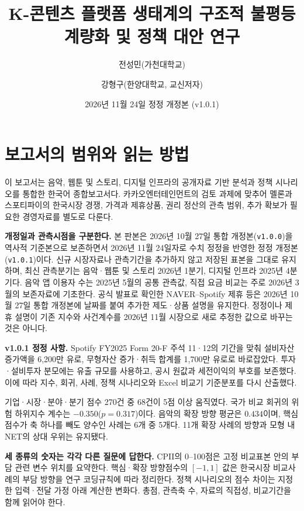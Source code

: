 \documentclass[11pt,a4paper]{report}
\title{K-콘텐츠 플랫폼 생태계의 구조적 불평등 계량화 및 정책 대안 연구}
\author{전성민(가천대학교) \and 강형구(한양대학교, 교신저자)}
\date{2026년 11월 24일 정정 개정본 (v1.0.1)}
\begin{document}
\ReportCover


\chapter*{보고서의 범위와 읽는 방법}
이 보고서는 음악, 웹툰 및 스토리, 디지털 인프라의 공개자료 기반 분석과 정책 시나리오를 통합한 한국어 종합보고서다. 카카오엔터테인먼트의 검토 과제에 맞추어 멜론과 스포티파이의 한국시장 경쟁, 가격과 제휴상품, 권리 정산의 관측 범위, 추가 확보가 필요한 경영자료를 별도로 다룬다.

\begin{ReportCallout}
\textbf{개정일과 관측시점을 구분한다.} 본 판본은 2026년 10월 27일 통합 개정본(\texttt{v1.0.0})을 역사적 기준본으로 보존하면서 2026년 11월 24일자로 수치 정정을 반영한 정정 개정본(\texttt{v1.0.1})이다. 신규 시장자료나 관측기간을 추가하지 않고 저장된 표본을 그대로 유지하며, 최신 관측분기는 음악·웹툰 및 스토리 2026년 1분기, 디지털 인프라 2025년 4분기다. 음악 앱 이용자 수는 2025년 5월의 공통 관측값, 직접 요금 비교는 주로 2026년 3월의 보존자료에 기초한다. 공식 발표로 확인한 NAVER--Spotify 제휴 등은 2026년 10월 27일 통합 개정본에 날짜를 붙여 추가한 제도·상품 설명을 유지한다. 정정이나 제휴 설명이 기존 지수와 사건계수를 2026년 11월 시장으로 새로 추정한 값으로 바꾸는 것은 아니다.
\end{ReportCallout}

\begin{ReportCallout}
\textbf{v1.0.1 정정 사항.} Spotify FY2025 Form 20-F 주석 11·12의 기간을 맞춰 설비자산 증가액을 6{,}200만 유로, 무형자산 증가·취득 합계를 1{,}700만 유로로 바로잡았다. 투자·설비투자 분모에는 유출 규모를 사용하고, 공시 원값과 세전이익의 부호를 보존했다. 이에 따라 지수, 회귀, 사례, 정책 시나리오와 Excel 비교기 기준분포를 다시 산출했다.

기업·시장·분야·분기 점수 270건 중 68건이 5점 이상 움직였다. 국가 비교 회귀의 위험 하위지수 계수는 $-0.350$($p=0.317$)이다. 음악의 확장 방향 평균은 $0.434$이며, 핵심 점수가 축 하나를 빼도 양수인 사례는 6개 중 5개다. 11개 확장 사례의 방향과 모형 내 NET의 상대 우위는 유지됐다.
\end{ReportCallout}

\begin{ReportCallout}
\textbf{세 종류의 숫자는 각각 다른 질문에 답한다.} CPII의 0--100점은 고정 비교표본 안의 부담 관련 변수 위치를 요약한다. 핵심·확장 방향점수의 $[-1,1]$ 값은 한국시장 비교사례의 부담 방향을 연구 코딩규칙에 따라 정리한다. 정책 시나리오의 점수 차이는 지정한 입력·전달 가정 아래 계산한 변화다. 총점, 관측축 수, 자료의 직접성, 비교기간을 함께 읽어야 한다.
\end{ReportCallout}
\end{document}
